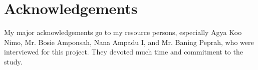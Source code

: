 \documentclass[output=paper,colorlinks,citecolor=brown]{langscibook}
\begin{document}
\section*{Acknowledgements}

My major acknowledgements go to my resource persons, especially Agya Koo Nimo, Mr. Bosie Amponsah, Nana Ampadu I, and Mr. Baning Peprah, who were interviewed for this project. They devoted much time and commitment to the study.

\printbibliography[heading=subbibliography,notkeyword=this]
\end{document}
